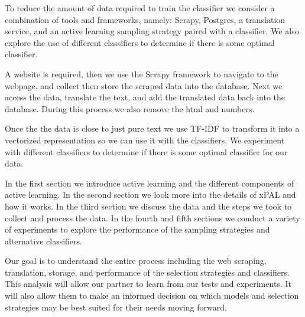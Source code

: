 To reduce the amount of data required to train the classifier we consider a combination of tools and frameworks, namely: Scrapy, Postgres, a translation service, and an active learning sampling strategy paired with a classifier. We also explore the use of different classifiers to determine if there is some optimal classifier.

A website is required, then we use the Scrapy framework to navigate to the webpage, and collect then store the scraped data into the database. Next we access the data, translate the text, and add the translated data back into the database. During this process we also remove the html and numbers.

Once the the data is close to just pure text we use TF-IDF to transform it into a vectorized representation so we can use it with the classifiers. We experiment with different classifiers to determine if there is some optimal classifier for our data.

In the first section we introduce active learning and the different components of active learning. In the second section we look more into the details of xPAL and how it works. In the third section we discuss the data and the steps we took to collect and process the data. In the fourth and fifth sections we conduct a variety of experiments to explore the performance of the sampling strategies and alternative classifiers. 

Our goal is to understand the entire process including the web scraping, translation, storage, and performance of the selection strategies and classifiers. This analysis will allow our partner to learn from our tests and experiments. It will also allow them to make an informed decision on which models and selection strategies may be best suited for their needs moving forward.